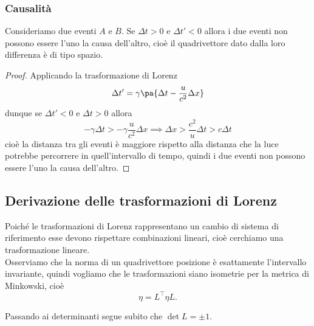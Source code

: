\subsubsection{Causalit\`a}
\begin{proposition}
Consideriamo due eventi $A$ e $B$. Se $\Delta t>0$ e $\Delta t'<0$ allora i due eventi non possono essere l'uno la causa dell'altro, cio\`e il quadrivettore dato dalla loro differenza \`e di tipo spazio.
\end{proposition}
\begin{proof}
Applicando la trasformazione di Lorenz
\[\Delta t'=\gamma\pa{\Delta t-\frac u{c^2}\Delta x}\]
dunque se $\Delta t'<0$ e $\Delta t>0$ allora
\[-\gamma\Delta t>-\gamma\frac u{c^2}\Delta x\implies \Delta x>\frac{c^2}{u}\Delta t>c\Delta t\]
cio\`e la distanza tra gli eventi \`e maggiore rispetto alla distanza che la luce potrebbe percorrere in quell'intervallo di tempo, quindi i due eventi non possono essere l'uno la causa dell'altro.
\end{proof}

\subsection{Derivazione delle trasformazioni di Lorenz}
Poich\'e le trasformazioni di Lorenz rappresentano un cambio di sistema di riferimento esse devono rispettare combinazioni lineari, cio\`e cerchiamo una trasformazione lineare.\\
Osserviamo che la norma di un quadrivettore posizione \`e esattamente l'intervallo invariante, quindi vogliamo che le trasformazioni siano isometrie per la metrica di Minkowski, cio\`e
\[\eta=L^\top\eta L.\]
\begin{remark}
Passando ai determinanti segue subito che $\det L=\pm 1$.
\end{remark}

